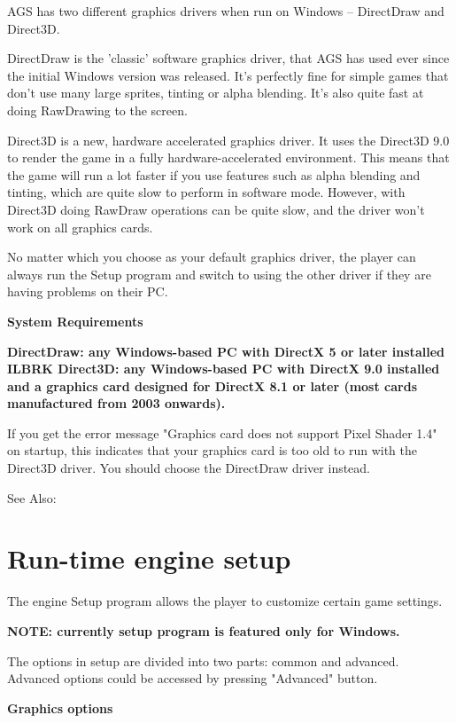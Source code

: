 AGS has two different graphics drivers when run on Windows -- DirectDraw and Direct3D.

DirectDraw is the 'classic' software graphics driver, that AGS has used ever since
the initial Windows version was released. It's perfectly fine for simple games
that don't use many large sprites, tinting or alpha blending. It's also quite fast
at doing RawDrawing to the screen.

Direct3D is a new, hardware accelerated graphics driver. It uses the Direct3D 9.0 to
render the game in a fully hardware-accelerated environment. This means that the
game will run a lot faster if you use features such as alpha blending and tinting,
which are quite slow to perform in software mode. However, with Direct3D doing RawDraw
operations can be quite slow, and the driver won't work on all graphics cards.

No matter which you choose as your default graphics driver, the player can always
run the Setup program and switch to using the other driver if they are having problems
on their PC.

\bf{System Requirements}

\bf{DirectDraw}: any Windows-based PC with DirectX 5 or later installed ILBRK
\bf{Direct3D}: any Windows-based PC with DirectX 9.0 installed and a graphics card designed
for DirectX 8.1 or later (most cards manufactured from 2003 onwards).

If you get the error message "Graphics card does not support Pixel Shader 1.4" on startup,
this indicates that your graphics card is too old to run with the Direct3D driver. You
should choose the DirectDraw driver instead.

See Also: 


\section{Run-time engine setup}%

The engine Setup program allows the player to customize certain game settings.

\bf{NOTE:} currently setup program is featured only for Windows.

The options in setup are divided into two parts: common and advanced. Advanced
options could be accessed by pressing "Advanced" button.

\bf{Graphics options}

